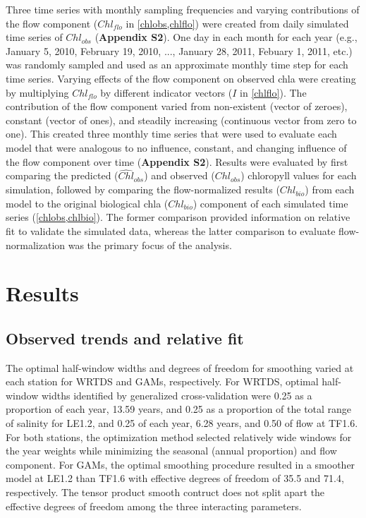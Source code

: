 \documentclass{svjour3}\usepackage[]{graphicx}\usepackage[]{color}
\begin{document}
Three time series with monthly sampling frequencies and varying contributions of the flow component ($Chl_{flo}$ in \cref{chlobs,chlflo}) were created from daily simulated time series of $Chl_{obs}$ ({\bf Appendix S2}). One day in each month for each year (e.g., January 5, 2010, February 19, 2010, ..., January 28, 2011, Febuary 1, 2011, etc.) was randomly sampled and used as an approximate monthly time step for each time series.  Varying effects of the flow component on observed \ac{chla} were creating by multiplying $Chl_{flo}$ by different indicator vectors ($I$ in \cref{chlflo}).  The contribution of the flow component varied from non-existent (vector of zeroes), constant (vector of ones), and steadily increasing (continuous vector from zero to one).  This created three monthly time series that were used to evaluate each model that were analogous to no influence, constant, and changing influence of the flow component over time ({\bf Appendix S2}).  Results were evaluated by first comparing the predicted ($\widehat{Chl}_{obs}$) and observed ($Chl_{obs}$) chloropyll values for each simulation, followed by comparing the flow-normalized results ($\widehat{Chl}_{bio}$) from each model to the original biological \ac{chla} ($Chl_{bio}$) component of each simulated time series (\cref{chlobs,chlbio}).  The former comparison provided information on relative fit to validate the simulated data, whereas the latter comparison to evaluate flow-normalization was the primary focus of the analysis.

\section{Results}

\subsection{Observed trends and relative fit}



The optimal half-window widths and degrees of freedom for smoothing varied at each station for \ac{WRTDS} and \acp{GAM}, respectively.  For \ac{WRTDS}, optimal half-window widths identified by generalized cross-validation were  0.25 as a proportion of each year, 13.59 years, and  0.25 as a proportion of the total range of salinity for LE1.2, and 0.25 of each year, 6.28 years, and 0.50 of flow at TF1.6.  For both stations, the optimization method selected relatively wide windows for the year weights while minimizing the seasonal (annual proportion) and flow component.  For \acp{GAM}, the optimal smoothing procedure resulted in a smoother model at LE1.2 than TF1.6 with effective degrees of freedom of 35.5 and 71.4, respectively.  The tensor product smooth contruct does not split apart the effective degrees of freedom among the three interacting parameters.     
\end{document}

